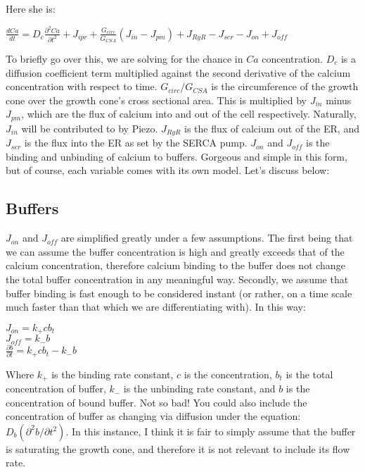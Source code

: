 \documentclass[12pt]{amsart}
\begin{document}
Here she is: 

\begin{center}

    $\frac{dCa}{dt} = D_c\frac{\partial^2 Ca}{\partial t^2} + J_{ipr} + \frac{G_{circ}}{G_{CSA}}(J_{in} - J_{pm}) + J_{RyR} - J_{ser} - J_{on} + J_{off}$

\end{center}

\bigskip

To briefly go over this, we are solving for the chance in $Ca$ concentration. $D_c$ is a diffusion coefficient term multiplied against the second derivative of the calcium concentration with respect to time. $G_{circ} / G_{CSA}$ is the circumference of the growth cone over the growth cone's cross sectional area. This is multiplied by $J_{in}$ minus $J_{pm}$, which are the flux of calcium into and out of the cell respectively. Naturally, $J_{in}$ will be contributed to by Piezo. $J_{RyR}$ is the flux of calcium out of the ER, and $J_{ser}$ is the flux into the ER as set by the SERCA pump. $J_{on}$ and $J_{off}$ is the binding and unbinding of calcium to buffers. Gorgeous and simple in this form, but of course, each variable comes with its own model. Let's discuss below: 

\subsection{Buffers} $J_{on}$ and $J_{off}$ are simplified greatly under a few assumptions. The first being that we can assume the buffer concentration is high and greatly exceeds that of the calcium concentration, therefore calcium binding to the buffer does not change the total buffer concentration in any meaningful way. Secondly, we assume that buffer binding is fast enough to be considered instant (or rather, on a time scale much faster than that which we are differentiating with). In this way:

\begin{center}

    $J_{on} = k_+cb_t$\\
    $J_{off} = k_-b$\\
    $\frac{\partial b}{\partial t} =  k_+cb_t - k_-b$
    
\end{center}
\bigskip

Where $k_+$ is the binding rate constant, $c$ is the concentration, $b_t$ is the total concentration of buffer, $k_-$ is the unbinding rate constant, and $b$ is the concentration of bound buffer. Not so bad! You could also include the concentration of buffer as changing via diffusion under the  equation: $D_b(\partial^2 b / \partial t^2)$. In this instance, I think it is fair to simply assume that the buffer is saturating the growth cone, and therefore it is not relevant to include its flow rate. 
\end{document}
